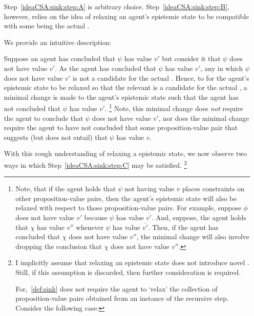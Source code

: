 \begin{note}
  Step~\ref{ideaCSA:sink:step:A} is arbitrary choice.
  Step~\ref{ideaCSA:sink:step:B}, however, relies on the idea of relaxing an agent's epistemic state to be compatible with some \epPAd{} \world{} being the actual \world{}.

  We provide an intuitive description:

  Suppose an agent has concluded that \(\psi\) has value \(v'\) but consider it \epPAd{} that \(\psi\) does not have value \(v'\).
  As the agent has concluded that \(\psi\) has value \(v'\), any \epP{} in which \(\psi\) does not have value \(v'\) is not a candidate for the actual \world{}.
  Hence, to for the agent's epistemic state to be relaxed so that the relevant \epPAd{} \world{} is a candidate for the actual \world{}, a minimal change is made to the agent's epistemic state such that the agent has not concluded that \(\psi\) has value \(v'\).\nolinebreak
  \footnote{
    Note, that if the agent holds that \(\psi\) not having value \(v\) places constraints on other proposition-value pairs, then the agent's epistemic state will also be relaxed with respect to those proposition-value pairs.
    For example, suppose \(\phi\) does not have value \(v'\) because \(\psi\) has value \(\overline{v'}\).
    And, suppose, the agent holds that \(\chi\) has value \(v''\) whenever \(\psi\) has value \(\overline{v'}\).
    Then, if the agent has concluded that \(\chi\) does not have value \(v''\), the minimal change will also involve dropping the conclusion that \(\chi\) does not have value \(v''\).
  }
  Note, this minimal change does \emph{not} require the agent to conclude that \(\psi\) does not have value \(v'\), nor does the minimal change require the agent to have not concluded that some proposition-value pair that suggests (but does not entail) that \(\psi\) has value \(v\).

  With this rough understanding of relaxing a epistemic state, we now observe two ways in which Step~\ref{ideaCSA:sink:step:C} may be satisfied.\nolinebreak
  \footnote{
    I implicitly assume that relaxing an epistemic state does not introduce novel \epPAd{} .
    Still, if this assumption is discarded, then further consideration is required.

    For,~\autoref{def:sink} does not require the agent to `relax' the collection of proposition-value pairs obtained from an instance of the recursive step.
    Consider the following case:

}
\end{note}
